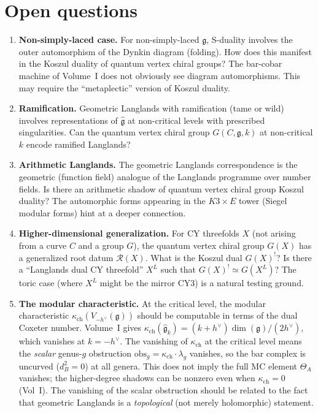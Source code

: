 \documentclass[11pt]{article}
\theoremstyle{definition}
\theoremstyle{remark}
\newcommand{\g}{\mathfrak{g}}
\newcommand{\hv}{h^\vee}
\begin{document}
\section{Open questions}
\label{sec:open}

\begin{enumerate}[label=\textbf{Q\arabic*.}]
 \item \textbf{Non-simply-laced case.} For non-simply-laced $\g$, S-duality
 involves the outer automorphism of the Dynkin diagram (folding). How does
 this manifest in the Koszul duality of quantum vertex chiral groups? The
 bar-cobar machine of Volume~I does not obviously see diagram automorphisms.
 This may require the ``metaplectic'' version of Koszul duality.

 \item \textbf{Ramification.} Geometric Langlands with ramification (tame or
 wild) involves representations of $\hat{\g}$ at non-critical levels with
 prescribed singularities. Can the quantum vertex chiral group $G(C,\g,k)$
 at non-critical $k$ encode ramified Langlands?

 \item \textbf{Arithmetic Langlands.} The geometric Langlands correspondence
 is the geometric (function field) analogue of the Langlands programme over
 number fields. Is there an arithmetic shadow of quantum vertex chiral
 group Koszul duality? The automorphic forms appearing in the $K3 \times E$
 tower (Siegel modular forms) hint at a deeper connection.

 \item \textbf{Higher-dimensional generalization.} For CY threefolds $X$
 (not arising from a curve $C$ and a group $G$), the quantum vertex chiral
 group $G(X)$ has a generalized root datum $\mathcal{R}(X)$. What is the
 Koszul dual $G(X)^!$? Is there a ``Langlands dual CY threefold'' $X^L$
 such that $G(X)^! \simeq G(X^L)$? The toric case (where $X^L$ might be
 the mirror CY3) is a natural testing ground.

 \item \textbf{The modular characteristic.} At the critical level, the
 modular characteristic $\kappa_{\mathrm{ch}}(V_{-\hv}(\g))$ should be computable in
 terms of the dual Coxeter number. Volume~I gives
 $\kappa_{\mathrm{ch}}(\hat{\g}_k) = (k + \hv) \dim(\g) / (2\hv)$, which vanishes at
 $k = -\hv$. The vanishing of $\kappa_{\mathrm{ch}}$ at the critical level means the
 \emph{scalar} genus-$g$ obstruction $\mathrm{obs}_g = \kappa_{\mathrm{ch}} \cdot \lambda_g$
 vanishes, so the bar complex is uncurved ($d_B^2 = 0$) at all genera.
 This does not imply the full MC element $\Theta_A$ vanishes; the
 higher-degree shadows can be nonzero even when $\kappa_{\mathrm{ch}} = 0$ (Vol~I).
 The vanishing of the scalar obstruction should be related to the fact
 that geometric Langlands is a \emph{topological} (not merely holomorphic)
 statement.


\end{enumerate}
\end{document}
